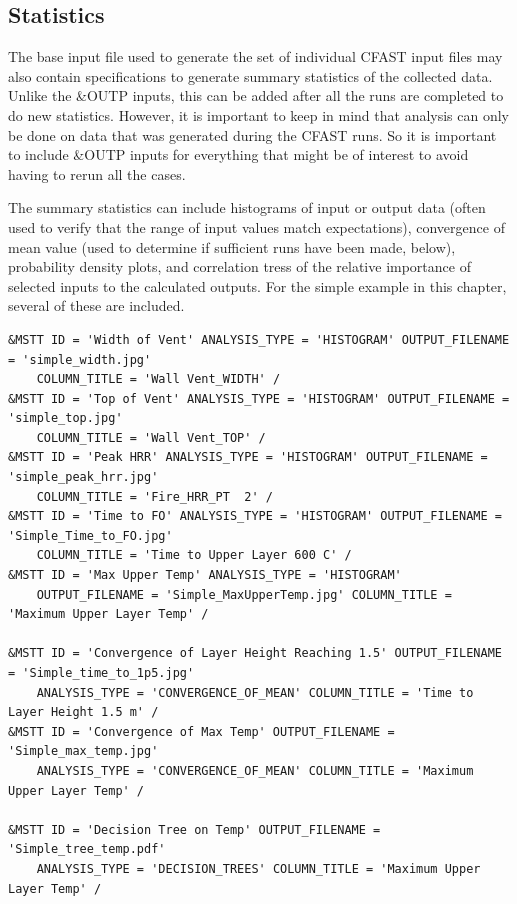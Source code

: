 \documentclass[12pt,twoside]{book}
\begin{document}
\subsection{Statistics}

The base input file used to generate the set of individual CFAST input files may also contain specifications to generate summary statistics of the collected data. Unlike the {\ct \&OUTP} inputs, this can be added after all the runs are completed to do new statistics. However, it is important to keep in mind that analysis can only be done on data that was generated during the CFAST runs. So it is important to include {\ct \&OUTP} inputs for everything that might be of interest to avoid having to rerun all the cases.

The summary statistics can include histograms of input or output data (often used to verify that the range of input values match expectations), convergence of mean value (used to determine if sufficient runs have been made, below), probability density plots, and correlation tress of the relative importance of selected inputs to the calculated outputs. For the simple example in this chapter, several of these are included.

\begin{lstlisting}[language=cdata, basicstyle=\scriptsize]
&MSTT ID = 'Width of Vent' ANALYSIS_TYPE = 'HISTOGRAM' OUTPUT_FILENAME = 'simple_width.jpg'
    COLUMN_TITLE = 'Wall Vent_WIDTH' /
&MSTT ID = 'Top of Vent' ANALYSIS_TYPE = 'HISTOGRAM' OUTPUT_FILENAME = 'simple_top.jpg'
    COLUMN_TITLE = 'Wall Vent_TOP' /
&MSTT ID = 'Peak HRR' ANALYSIS_TYPE = 'HISTOGRAM' OUTPUT_FILENAME = 'simple_peak_hrr.jpg'
    COLUMN_TITLE = 'Fire_HRR_PT  2' /
&MSTT ID = 'Time to FO' ANALYSIS_TYPE = 'HISTOGRAM' OUTPUT_FILENAME = 'Simple_Time_to_FO.jpg'
    COLUMN_TITLE = 'Time to Upper Layer 600 C' /
&MSTT ID = 'Max Upper Temp' ANALYSIS_TYPE = 'HISTOGRAM'
    OUTPUT_FILENAME = 'Simple_MaxUpperTemp.jpg' COLUMN_TITLE = 'Maximum Upper Layer Temp' /

&MSTT ID = 'Convergence of Layer Height Reaching 1.5' OUTPUT_FILENAME = 'Simple_time_to_1p5.jpg'
    ANALYSIS_TYPE = 'CONVERGENCE_OF_MEAN' COLUMN_TITLE = 'Time to Layer Height 1.5 m' /
&MSTT ID = 'Convergence of Max Temp' OUTPUT_FILENAME = 'Simple_max_temp.jpg'
    ANALYSIS_TYPE = 'CONVERGENCE_OF_MEAN' COLUMN_TITLE = 'Maximum Upper Layer Temp' /

&MSTT ID = 'Decision Tree on Temp' OUTPUT_FILENAME = 'Simple_tree_temp.pdf'
    ANALYSIS_TYPE = 'DECISION_TREES' COLUMN_TITLE = 'Maximum Upper Layer Temp' /
\end{lstlisting}
\end{document}
